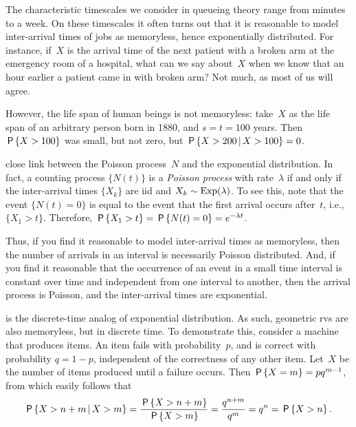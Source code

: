 \documentclass[stochastic-or.tex]{subfiles}
\begin{document}
The characteristic timescales we consider in queueing theory range from minutes to a week.
On these timescales it often turns out that it is reasonable to model inter-arrival times of jobs as memoryless, hence exponentially distributed.
For instance, if~$X$ is the arrival time of the next patient with a broken arm at the emergency room of a hospital, what can we say about~$X$ when we know that an hour earlier a patient came in with broken arm?
Not much, as most of us will agree.

However, the life span of human beings is not memoryless: take~$X$ as the life span of an arbitrary person born in 1880, and $s=t = 100$ years. Then $\P{X>100}$ was small, but not zero, but $\P{X>200 \given X>100} = 0$.%


 close link between the Poisson process~$N$ and the exponential distribution.
In fact, a counting process $\{N(t)\}$ is a \emph{Poisson process} with rate~$\lambda$ if and only if the inter-arrival times $\{X_k\}$ are iid and $X_{k} \sim \Exp{\lambda}$.
To see this, note that the event $\{N(t)= 0\}$ is equal to the event that the first arrival occurs after~$t$, i.e., $\{X_1 > t\}$.
Therefore, $\P{X_1> t} = \P{N(t) = 0} = e^{-\lambda t}$.


Thus, if you find it reasonable to model inter-arrival times as memoryless, then the number of arrivals in an interval is necessarily Poisson distributed.
And, if you find it reasonable that the occurrence of an event in a small time interval is constant over time and independent from one interval to another, then the arrival process is Poisson, and the inter-arrival times are exponential.


 is the discrete-time analog of exponential distribution.
As such, geometric rvs are also memoryless, but in discrete time.
To demonstrate this, consider a machine that produces items.
An item fails with probability~$p$, and is correct with probability $q=1-p$, independent of the correctness of any other item.
Let~$X$ be the number of items produced until a failure occurs.  Then $\P{X=m} =  p q^{m-1}$, from which easily follows that
\begin{equation*}
\P{X>n+m\given X>m} = \frac{\P{X>n+m}}{\P{X>m}} = \frac{q^{n+m}}{q^m}=q^{n} = \P{X>n}.
\end{equation*}
\end{document}
